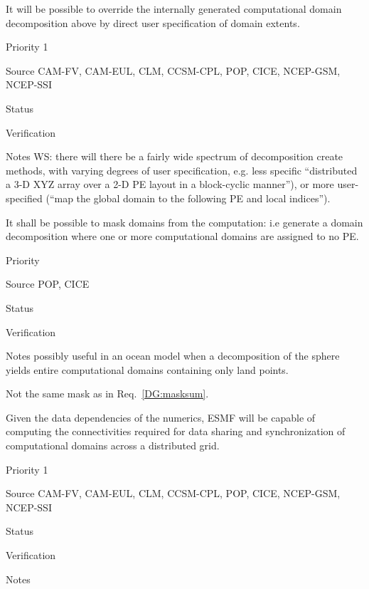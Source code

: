 
It will be possible to override the internally generated computational
domain decomposition above by direct user specification of domain
extents.

\begin{reqlist}
\item[Priority] 1
\item[Source] CAM-FV, CAM-EUL, CLM, CCSM-CPL, POP, CICE, NCEP-GSM, NCEP-SSI
\item[Status]
\item[Verification]
\item[Notes] WS:  there will there be a fairly wide spectrum 
of decomposition create methods, with varying degrees of user
specification, e.g. less specific ``distributed a 3-D XYZ array 
over a 2-D PE layout in a block-cyclic manner''), or more 
user-specified (``map the global domain to the following PE 
and local indices'').

\end{reqlist}

 \label{DG:masklayout}

It shall be possible to mask domains from the computation: i.e
generate a domain decomposition where one or more computational
domains are assigned to no PE.

\begin{reqlist}
\item[Priority]
\item[Source] POP, CICE 
\item[Status]
\item[Verification]
\item[Notes] possibly useful in an ocean model when a decomposition
  of the sphere yields entire computational domains containing only
  land points.

  Not the same mask as in Req.~\ref{DG:masksum}.
\end{reqlist}


Given the data dependencies of the numerics, ESMF will be capable of
computing the connectivities required for data sharing and
synchronization of computational domains across a distributed grid.


\begin{reqlist}
\item[Priority] 1
\item[Source] CAM-FV, CAM-EUL, CLM, CCSM-CPL, POP, CICE, NCEP-GSM, NCEP-SSI
\item[Status]
\item[Verification]
\item[Notes] 

\end{reqlist}

